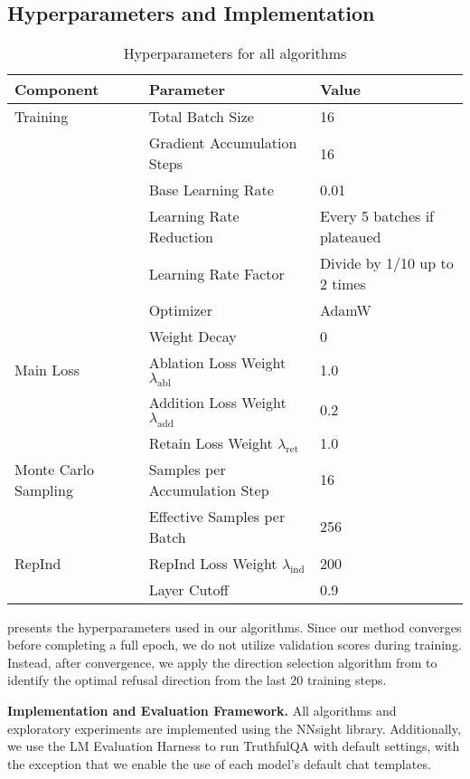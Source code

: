 \subsection{Hyperparameters and Implementation}
\begin{table}[h]
\centering
\caption{Hyperparameters for all algorithms}
\begin{tabular}{lll}
\toprule
\textbf{Component} & \textbf{Parameter} & \textbf{Value} \\
\midrule
Training & Total Batch Size & 16 \\
& Gradient Accumulation Steps & 16 \\
& Base Learning Rate & 0.01 \\
& Learning Rate Reduction & Every 5 batches if plateaued \\
& Learning Rate Factor & Divide by 1/10 up to 2 times \\
& Optimizer & AdamW \\
& Weight Decay & 0 \\
\midrule
Main Loss & Ablation Loss Weight $\lambda_{\text{abl}}$ & 1.0 \\
& Addition Loss Weight $\lambda_{\text{add}}$ & 0.2 \\
& Retain Loss Weight $\lambda_{\text{ret}}$ & 1.0 \\
\midrule
Monte Carlo Sampling & Samples per Accumulation Step & 16 \\
& Effective Samples per Batch & 256 \\
\midrule
RepInd  & RepInd Loss Weight $\lambda_{\text{ind}}$ & 200 \\
 & Layer Cutoff & 0.9\\
\bottomrule
\end{tabular}
\label{tab:hyperparameters}
\end{table}
 presents the hyperparameters used in our algorithms. Since our method converges before completing a full epoch, we do not utilize validation scores during training. Instead, after convergence, we apply the direction selection algorithm from \citet{arditi2024refusallanguagemodelsmediated} to identify the optimal refusal direction from the last 20 training steps.

\textbf{Implementation and Evaluation Framework.}
All algorithms and exploratory experiments are implemented using the NNsight \cite{fiotto2024nnsight} library. Additionally, we use the LM Evaluation Harness \cite{eval-harness} to run TruthfulQA \cite{lin2021truthfulqa} with default settings, with the exception that we enable the use of each model’s default chat templates.

